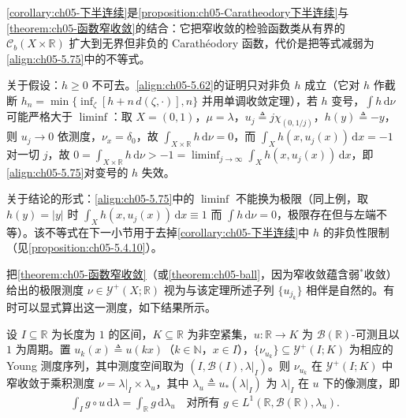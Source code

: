 \documentclass[../../main.tex]{subfiles}%
\begin{document}
\begin{remark}\label{remark:ch05-下半连续估计}
\cref{corollary:ch05-下半连续}是\cref{proposition:ch05-Caratheodory下半连续}与\cref{theorem:ch05-函数窄收敛}的结合：它把窄收敛的检验函数类从有界的 $\mathcal{C}_b(X\times\mathbb{R})$ 扩大到无界但非负的 Carathéodory 函数，代价是把等式减弱为\eqref{align:ch05-5.75}中的不等式。

关于假设：$h\geqslant0$ 不可去。\eqref{align:ch05-5.62}的证明只对非负 $h$ 成立（它对 $h$ 作截断 $h_n=\min\{\inf_\zeta[h+n\,d(\zeta,\cdot)],n\}$ 并用单调收敛定理），若 $h$ 变号，$\int h\,\mathrm{d}\nu$ 可能严格大于 $\liminf$：取 $X=(0,1)$，$\mu=\lambda$，$u_j\triangleq j\chi_{(0,1/j)}$，$h(y)\triangleq-y$，则 $u_j\to0$ 依测度，$\nu_x=\delta_0$，故 $\int_{X\times\mathbb{R}}h\,\mathrm{d}\nu=0$，而 $\int_Xh(x,u_j(x))\,\mathrm{d}x=-1$ 对一切 $j$，故 $0=\int_{X\times\mathbb{R}}h\,\mathrm{d}\nu>-1=\liminf_{j\to\infty}\int_Xh(x,u_j(x))\,\mathrm{d}x$，即\eqref{align:ch05-5.75}对变号的 $h$ 失效。

关于结论的形式：\eqref{align:ch05-5.75}中的 $\liminf$ 不能换为极限（同上例，取 $h(y)=|y|$ 时 $\int_Xh(x,u_j(x))\,\mathrm{d}x\equiv1$ 而 $\int h\,\mathrm{d}\nu=0$，极限存在但与左端不等）。该不等式在下一小节用于去掉\cref{corollary:ch05-下半连续}中 $h$ 的非负性限制（见\cref{proposition:ch05-5.4.10}）。
\end{remark}

把\cref{theorem:ch05-函数窄收敛}（或\cref{theorem:ch05-ball}，因为窄收敛蕴含弱$^*$收敛）给出的极限测度 $\nu\in\mathcal{Y}^+(X;\mathbb{R})$ 视为与该定理所述子列 $\{u_{j_k}\}$ 相伴是自然的。有时可以显式算出这一测度，如下结果所示。

\begin{proposition}\label{proposition:ch05-周期平均}
设 $I\subseteq\mathbb{R}$ 为长度为 $1$ 的区间，$K\subseteq\mathbb{R}$ 为非空紧集，$u:\mathbb{R}\to K$ 为 $\mathscr{B}(\mathbb{R})$-可测且以 $1$ 为周期。置 $u_k(x)\triangleq u(kx)$（$k\in\mathbb{N}$，$x\in I$），$\{\nu_{u_k}\}\subseteq\mathcal{Y}^+(I;K)$ 为相应的 Young 测度序列，其中测度空间取为 $(I,\mathscr{B}(I),\lambda|_I)$。则 $\nu_{u_k}$ 在 $\mathcal{Y}^+(I;K)$ 中窄收敛于乘积测度 $\nu=\lambda|_I\times\lambda_u$，其中 $\lambda_u\triangleq u_*(\lambda|_I)$ 为 $\lambda|_I$ 在 $u$ 下的像测度，即
\begin{align*}
\int_Ig\circ u\,\mathrm{d}\lambda=\int_{\mathbb{R}}g\,\mathrm{d}\lambda_u
\quad\text{对所有 }g\in L^1(\mathbb{R},\mathscr{B}(\mathbb{R}),\lambda_u).
\end{align*}
\end{proposition}
\end{document}
